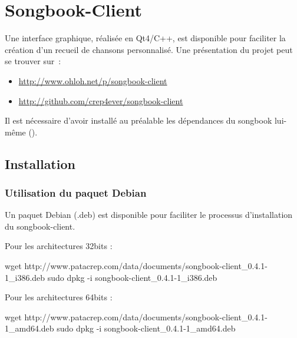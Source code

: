 \chapter{Songbook-Client}
\setcounter{chapter}{2}
\label{chap:songbook-client}
\minitoc

Une interface graphique, réalisée en Qt4/C++, est disponible pour
faciliter la création d'un recueil de chansons personnalisé. Une
présentation du projet peut se trouver sur~:
\begin{itemize}
\item \url{http://www.ohloh.net/p/songbook-client}
\item \url{http://github.com/crep4ever/songbook-client}
\end{itemize}

Il est nécessaire d'avoir installé au préalable les dépendances du
songbook lui-même (). 


\section{Installation}

\subsection{Utilisation du paquet Debian}

Un paquet Debian (.deb) est disponible pour faciliter le processus
d'installation du songbook-client.

Pour les architectures 32bits :

\begin{unixcom}
  wget http://www.patacrep.com/data/documents/songbook-client_0.4.1-1_i386.deb
  sudo dpkg -i songbook-client_0.4.1-1_i386.deb
\end{unixcom}

Pour les architectures 64bits :

\begin{unixcom}
  wget http://www.patacrep.com/data/documents/songbook-client_0.4.1-1_amd64.deb
  sudo dpkg -i songbook-client_0.4.1-1_amd64.deb
\end{unixcom}



